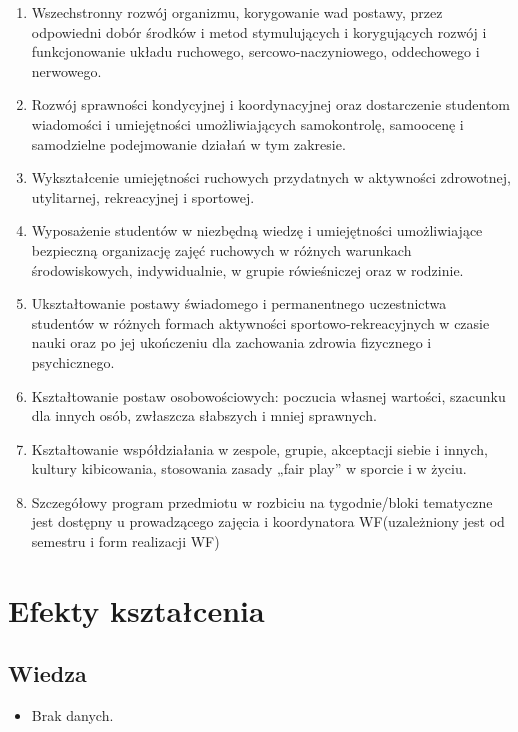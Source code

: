 \documentclass[12pt, a4paper]{article}
\begin{document}
\begin{enumerate}
  \item Wszechstronny rozwój organizmu, korygowanie wad postawy, przez odpowiedni dobór środków i metod stymulujących i korygujących rozwój i funkcjonowanie układu ruchowego, sercowo-naczyniowego, oddechowego i nerwowego.
  \item Rozwój sprawności kondycyjnej i koordynacyjnej oraz dostarczenie studentom wiadomości i umiejętności umożliwiających samokontrolę, samoocenę i samodzielne podejmowanie działań w tym zakresie.
  \item Wykształcenie umiejętności ruchowych przydatnych w aktywności zdrowotnej, utylitarnej, rekreacyjnej i sportowej.
  \item Wyposażenie studentów w niezbędną wiedzę i umiejętności umożliwiające bezpieczną organizację zajęć ruchowych w różnych warunkach środowiskowych, indywidualnie, w grupie rówieśniczej oraz w rodzinie.
  \item Ukształtowanie postawy świadomego i permanentnego uczestnictwa studentów w różnych formach aktywności sportowo-rekreacyjnych w czasie nauki oraz po jej ukończeniu dla zachowania zdrowia fizycznego i psychicznego.
  \item Kształtowanie postaw osobowościowych: poczucia własnej wartości, szacunku dla innych osób, zwłaszcza słabszych i mniej sprawnych.
  \item Kształtowanie współdziałania w zespole, grupie, akceptacji siebie i innych, kultury kibicowania, stosowania zasady „fair play” w sporcie i w życiu.
  \item Szczegółowy program przedmiotu w rozbiciu na tygodnie/bloki tematyczne jest dostępny u prowadzącego zajęcia i koordynatora WF(uzależniony jest od semestru i form realizacji WF)
\end{enumerate}

\section{Efekty kształcenia}

\subsection*{Wiedza}
\begin{itemize}
  \item Brak danych.
\end{itemize}
\end{document}
